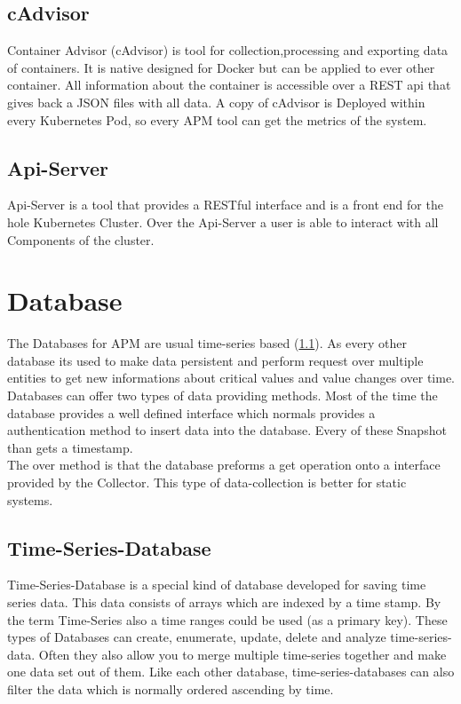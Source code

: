 \subsection{cAdvisor}
\label{cadvisor}
Container Advisor (cAdvisor) is tool for collection,processing and exporting data of containers. It is native designed for Docker but can be applied to ever other container. All information about the container is accessible over a REST api that gives back a JSON files with all data. A copy of cAdvisor is Deployed within every Kubernetes Pod, so every APM tool can get the metrics of the system.
\subsection{Api-Server}
\label{apiserver} 
Api-Server is a tool that provides a RESTful interface and is a front end for the hole Kubernetes Cluster. Over the Api-Server a user is able to interact with all Components of the cluster. 
\section{Database}
The Databases for APM are usual time-series based (\ref{TS-Database}). As every other database its used to make data persistent and perform request over multiple entities to get new informations about critical values and value changes over time.
Databases can offer two types of data providing methods. Most of the time the database provides a well defined interface which normals provides a authentication method to insert data into the database. Every of these Snapshot than gets a timestamp.\\
The over method is that the database preforms a get operation onto a interface provided by the Collector. This type of data-collection is better for static systems.

\subsection{Time-Series-Database}
\label{TS-Database}
 Time-Series-Database is a special kind of database developed for saving time series data. This data consists of arrays which are indexed by a time stamp. By the term Time-Series also a time ranges could be used (as a primary key). These types of Databases  can create, enumerate, update, delete and analyze time-series-data.
Often they also allow you to merge multiple time-series together and make one data set out of them.
Like each other database, time-series-databases can also filter the data which is normally ordered ascending by time.

